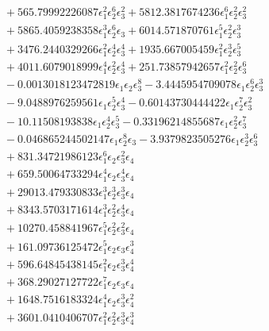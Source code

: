 \documentclass[10pt]{article}
\begin{document}
\begin{align*}
&{}  + 565.79992226087 \epsilon_{1}^{2} \epsilon_{2}^{6} \epsilon_{3}^{2} + 5812.3817674236 \epsilon_{1}^{6} \epsilon_{2}^{2} \epsilon_{3}^{2} \\
&{}  + 5865.4059238358 \epsilon_{1}^{3} \epsilon_{2}^{6} \epsilon_{3} + 6014.571870761 \epsilon_{1}^{5} \epsilon_{2}^{2} \epsilon_{3}^{3} \\
&{}  + 3476.2440329266 \epsilon_{1}^{2} \epsilon_{2}^{4} \epsilon_{3}^{4} + 1935.667005459 \epsilon_{1}^{2} \epsilon_{2}^{3} \epsilon_{3}^{5} \\
&{}  + 4011.6079018999 \epsilon_{1}^{4} \epsilon_{2}^{2} \epsilon_{3}^{4} + 251.73857942657 \epsilon_{1}^{2} \epsilon_{2}^{2} \epsilon_{3}^{6} \\
&{}  - 0.0013018123472819 \epsilon_{1} \epsilon_{2} \epsilon_{3}^{8} - 3.4445954709078 \epsilon_{1} \epsilon_{2}^{6} \epsilon_{3}^{3} \\
&{}  - 9.0488976259561 \epsilon_{1} \epsilon_{2}^{5} \epsilon_{3}^{4} - 0.60143730444422 \epsilon_{1} \epsilon_{2}^{7} \epsilon_{3}^{2} \\
&{}  - 10.11508193838 \epsilon_{1} \epsilon_{2}^{4} \epsilon_{3}^{5} - 0.33196214855687 \epsilon_{1} \epsilon_{2}^{2} \epsilon_{3}^{7} \\
&{}  - 0.046865244502147 \epsilon_{1} \epsilon_{2}^{8} \epsilon_{3} - 3.9379823505276 \epsilon_{1} \epsilon_{2}^{3} \epsilon_{3}^{6} \\
&{}  + 831.34721986123 \epsilon_{1}^{6} \epsilon_{2} \epsilon_{3}^{2} \epsilon_{4} \\
&{}  + 659.50064733294 \epsilon_{1}^{4} \epsilon_{2} \epsilon_{3}^{4} \epsilon_{4} \\
&{}  + 29013.479330833 \epsilon_{1}^{3} \epsilon_{2}^{3} \epsilon_{3}^{3} \epsilon_{4} \\
&{}  + 8343.5703171614 \epsilon_{1}^{3} \epsilon_{2}^{2} \epsilon_{3}^{4} \epsilon_{4} \\
&{}  + 10270.458841967 \epsilon_{1}^{5} \epsilon_{2}^{2} \epsilon_{3}^{2} \epsilon_{4} \\
&{}  + 161.09736125472 \epsilon_{1}^{5} \epsilon_{2} \epsilon_{3} \epsilon_{4}^{3} \\
&{}  + 596.64845438145 \epsilon_{1}^{2} \epsilon_{2} \epsilon_{3}^{3} \epsilon_{4}^{4} \\
&{}  + 368.29027127722 \epsilon_{1}^{7} \epsilon_{2} \epsilon_{3} \epsilon_{4} \\
&{}  + 1648.7516183324 \epsilon_{1}^{4} \epsilon_{2} \epsilon_{3}^{3} \epsilon_{4}^{2} \\
&{}  + 3601.0410406707 \epsilon_{1}^{2} \epsilon_{2}^{2} \epsilon_{3}^{3} \epsilon_{4}^{3} \\

\end{align*}
\end{document}

